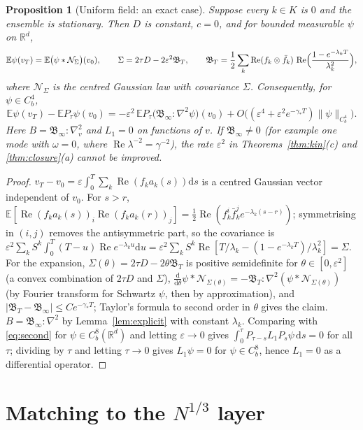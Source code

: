 \documentclass[11pt]{article}
\newcommand{\dd}{\mathrm{d}}
\newcommand{\E}{\mathbb{E}}
\newcommand{\eps}{\varepsilon}
\newcommand{\R}{\mathbb{R}}
\renewcommand{\Re}{\operatorname{Re}}
\newcommand{\nrm}[2]{\|#1\|_{#2}}
\newtheorem{proposition}[theorem]{Proposition}
\theoremstyle{remark}
\begin{document}
\begin{proposition}[Uniform field: an exact case]\label{prop:uniform}
Suppose every $k\in K$ is $0$ and the ensemble is stationary. Then $D$ is
constant, $c=0$, and for bounded measurable $\psi$ on $\R^d$,
\[
  \E\psi(v_T)=\E\bigl(\psi*\mathcal N_{\Sigma}\bigr)(v_0),\qquad
  \Sigma=2\tau D-2\eps^2\mathfrak B_T,\qquad
  \mathfrak B_T=\frac12\sum_k\Re(f_k\otimes\bar f_k)\,
     \Re\Bigl(\frac{1-e^{-\lambda_kT}}{\lambda_k^2}\Bigr),
\]
where $\mathcal N_\Sigma$ is the centred Gaussian law with covariance
$\Sigma$. Consequently, for $\psi\in C_b^4$,
\[
  \E\psi(v_T)-\E P_\tau\psi(v_0)
  =-\eps^2\,\E P_\tau\bigl(\mathfrak B_\infty:\nabla^2\psi\bigr)(v_0)
   +O\bigl((\eps^4+\eps^2e^{-\gamma_*T})\nrm{\psi}{C_b^4}\bigr).
\]
Here $B=\mathfrak B_\infty:\nabla_v^2$ and $L_1=0$ on functions of $v$. If
$\mathfrak B_\infty\ne0$ (for example one mode with $\omega=0$, where
$\Re\lambda^{-2}=\gamma^{-2}$), the rate $\eps^2$ in
Theorems~\ref{thm:kin}(c) and \ref{thm:closure}(a) cannot be improved.
\end{proposition}

\begin{proof}
$v_T-v_0=\eps\int_0^T\sum_k\Re(f_ka_k(s))\dd s$ is a centred Gaussian
vector independent of $v_0$. For $s>r$,
$\E[\Re(f_ka_k(s))_i\Re(f_ka_k(r))_j]=\frac12\Re(f_k^i\bar f_k^je^{-\lambda_k
(s-r)})$; symmetrising in $(i,j)$ removes the antisymmetric part, so the
covariance is $\eps^2\sum_kS^k\int_0^T(T-u)\Re e^{-\lambda_ku}\dd u
=\eps^2\sum_kS^k\Re[T/\lambda_k-(1-e^{-\lambda_kT})/\lambda_k^2]=\Sigma$. For
the expansion, $\Sigma(\theta)=2\tau D-2\theta\mathfrak B_T$ is positive
semidefinite for $\theta\in[0,\eps^2]$ (a convex combination of $2\tau D$
and $\Sigma$), $\frac{\dd}{\dd\theta}\psi*\mathcal N_{\Sigma(\theta)}
=-\mathfrak B_T:\nabla^2(\psi*\mathcal N_{\Sigma(\theta)})$ (by Fourier
transform for Schwartz $\psi$, then by approximation), and
$|\mathfrak B_T-\mathfrak B_\infty|\le Ce^{-\gamma_*T}$; Taylor's formula to
second order in $\theta$ gives the claim. $B=\mathfrak B_\infty:\nabla^2$ by
Lemma~\ref{lem:explicit} with constant $\lambda_k$. Comparing with
\eqref{eq:second} for $\psi\in C_b^8(\R^d)$ and letting $\eps\to0$ gives
$\int_0^\tau P_{\tau-s}L_1P_s\psi\,\dd s=0$ for all $\tau$; dividing by
$\tau$ and letting $\tau\to0$ gives $L_1\psi=0$ for $\psi\in C_b^8$, hence
$L_1=0$ as a differential operator.
\end{proof}

\section{Matching to the $N^{1/3}$ layer}
\end{document}

